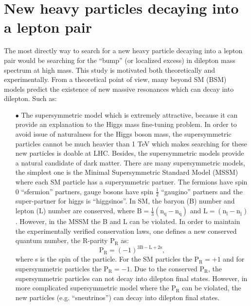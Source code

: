 \section{New heavy particles decaying into a lepton pair}\label{sec:HeavyResonance}
The most directly way to search for a new heavy particle decaying into a lepton pair would be searching for the ``bump'' (or localized excess) in dilepton mass spectrum at high mass. This study is motivated both theoretically and experimentally. From a theoretical point of view, many beyond SM (BSM) models predict the existence of new massive resonances which can decay into dilepton. Such as:
\begin{enumerate}
\item[$\bullet$] The supersymmetric model \cite{Barbier} which is extremely attractive, because it can provide an explanation to the Higgs mass fine-tuning problem. In order to avoid issue of naturalness for the Higgs boson mass, the supersymmetric particles cannot be
much heavier than 1 TeV which makes searching for these new particles is doable at LHC. Besides, the supersymmetric models provide a natural candidate of dark matter. There are many supersymmetric models, the simplest one is the Minimal Supersymmetric Standard Model (MSSM) where each SM particle has a superymmetric partner. The fermions have spin 0 ``sfermion'' partners, gauge bosons have spin $\frac{1}{2}$ ``gaugino'' partners and the super-partner for higgs is ``higgsinos''.
In SM, the baryon (B) number and lepton (L) number are conserved, where $\mathrm{B=\frac{1}{3}(n_q-n_{\overline{q}})}$ and $\mathrm{L=(n_l-n_{\overline{l}})}$. However, in the MSSM the B and L can be violated. In order to maintain the experimentally verified conservation laws, one defines a new conserved quantum number, the R-parity $\mathrm{P_R}$ as:
$$\mathrm{P_R=(-1)^{3B-L+2s}},$$
where s is the spin of the particle. For the SM particles the $\mathrm{P_R}=+1$ and for supersymmetric particles the $\mathrm{P_R}=-1$. Due to the conserved $\mathrm{P_R}$, the supersymmetric particles can not decay into dilepton final states. However, in more complicated supersymmetric model \cite{BARBIER20051} where the $\mathrm{P_R}$ can be violated, the new particles (e.g. ``sneutrinos'') can decay into dilepton final states.



\end{enumerate}
